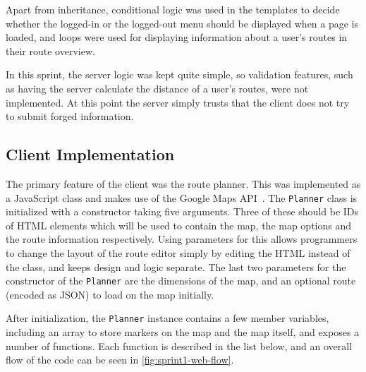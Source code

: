 Apart from inheritance, conditional logic was used in the templates to decide whether the logged-in or the logged-out menu should be displayed when a page is loaded, and loops were used for displaying information about a user's routes in their route overview.

In this sprint, the server logic was kept quite simple, so validation features, such as having the server calculate the distance of a user's routes, were not implemented. At this point the server simply trusts that the client does not try to submit forged information.

\subsection{Client Implementation}

The primary feature of the client was the route planner. This was implemented as a JavaScript class and makes use of the Google Maps \ac{API}~\citep{gmapsapi}. The \texttt{Planner} class is initialized with a constructor taking five arguments. Three of these should be IDs of \ac{HTML} elements which will be used to contain the map, the map options and the route information respectively. Using parameters for this allows programmers to change the layout of the route editor simply by editing the \ac{HTML} instead of the class, and keeps design and logic separate. The last two parameters for the constructor of the \texttt{Planner} are the dimensions of the map, and an optional route (encoded as \ac{JSON}) to load on the map initially.

After initialization, the \texttt{Planner} instance contains a few member variables, including an array to store markers on the map and the map itself, and exposes a number of functions. Each function is described in the list below, and an overall flow of the code can be seen in \autoref{fig:sprint1-web-flow}.

